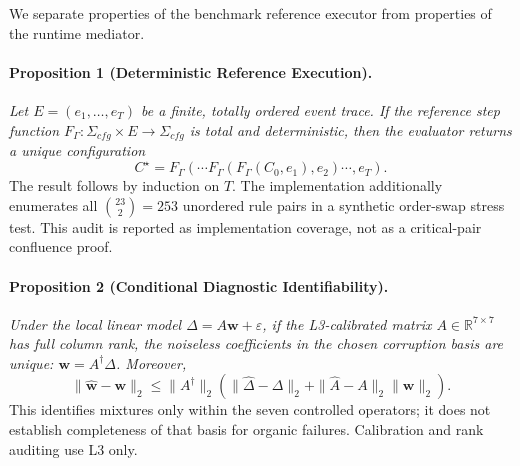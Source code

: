 We separate properties of the benchmark reference executor from properties of the runtime mediator.

\paragraph{Proposition 1 (Deterministic Reference Execution).}\label{prop:reference_determinism}
\emph{Let $E=(e_1,\ldots,e_T)$ be a finite, totally ordered event trace. If the reference step function $F_\Gamma:\Sigma_{cfg}\times E\rightarrow\Sigma_{cfg}$ is total and deterministic, then the evaluator returns a unique configuration}
\begin{equation}
C^\star=F_\Gamma(\cdots F_\Gamma(F_\Gamma(C_0,e_1),e_2)\cdots,e_T).
\end{equation}
The result follows by induction on $T$. The implementation additionally enumerates all $\binom{23}{2}=253$ unordered rule pairs in a synthetic order-swap stress test. This audit is reported as implementation coverage, not as a critical-pair confluence proof.

\paragraph{Proposition 2 (Conditional Diagnostic Identifiability).}\label{thm:diagnostic_identifiability}
\emph{Under the local linear model $\Delta=A\mathbf w+\varepsilon$, if the L3-calibrated matrix $A\in\mathbb R^{7\times7}$ has full column rank, the noiseless coefficients in the chosen corruption basis are unique: $\mathbf w=A^\dagger\Delta$. Moreover,}
\begin{equation}
\|\widehat{\mathbf{w}} - \mathbf{w}\|_2 \le \|A^\dagger\|_2 \left( \|\widehat\Delta - \Delta\|_2 + \|\widehat A - A\|_2 \|\mathbf{w}\|_2 \right).
\end{equation}
This identifies mixtures only within the seven controlled operators; it does not establish completeness of that basis for organic failures. Calibration and rank auditing use L3 only.

